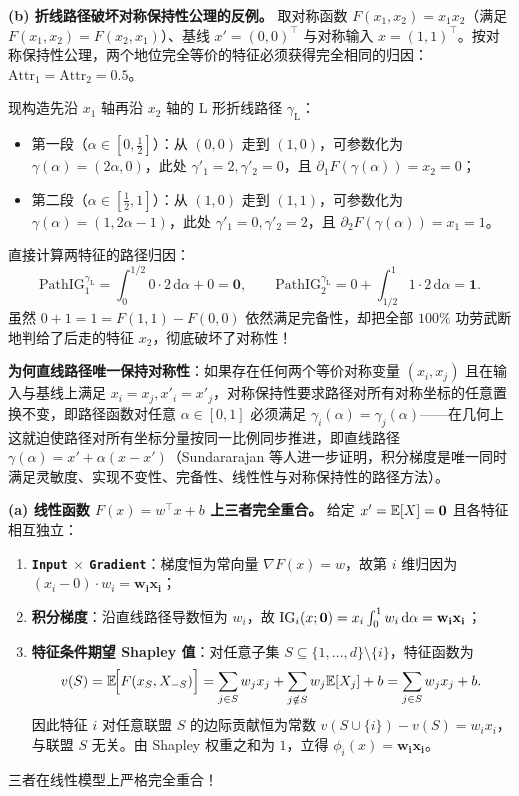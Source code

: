 \textbf{(b) 折线路径破坏对称保持性公理的反例。}
取对称函数 $F(x_1, x_2) = x_1 x_2$（满足 $F(x_1, x_2) = F(x_2, x_1)$）、基线 $x' = (0,0)^\top$ 与对称输入 $x = (1,1)^\top$。按对称保持性公理，两个地位完全等价的特征必须获得完全相同的归因：$\mathrm{Attr}_1 = \mathrm{Attr}_2 = 0.5$。

现构造先沿 $x_1$ 轴再沿 $x_2$ 轴的 L 形折线路径 $\gamma_{\text{L}}$：
\begin{itemize}
  \item 第一段（$\alpha \in [0, \frac{1}{2}]$）：从 $(0,0)$ 走到 $(1,0)$，可参数化为 $\gamma(\alpha) = (2\alpha, 0)$，此处 $\gamma'_1 = 2, \gamma'_2 = 0$，且 $\partial_1 F(\gamma(\alpha)) = x_2 = 0$；
  \item 第二段（$\alpha \in [\frac{1}{2}, 1]$）：从 $(1,0)$ 走到 $(1,1)$，可参数化为 $\gamma(\alpha) = (1, 2\alpha - 1)$，此处 $\gamma'_1 = 0, \gamma'_2 = 2$，且 $\partial_2 F(\gamma(\alpha)) = x_1 = 1$。
\end{itemize}
直接计算两特征的路径归因：
\[
  \mathrm{PathIG}_1^{\gamma_{\text{L}}} = \int_0^{1/2} 0 \cdot 2\,\mathrm{d}\alpha + 0 = \mathbf{0}, \qquad
  \mathrm{PathIG}_2^{\gamma_{\text{L}}} = 0 + \int_{1/2}^{1} 1 \cdot 2\,\mathrm{d}\alpha = \mathbf{1}.
\]
虽然 $0 + 1 = 1 = F(1,1) - F(0,0)$ 依然满足完备性，却把全部 $100\%$ 功劳武断地判给了后走的特征 $x_2$，彻底破坏了对称性！

\textbf{为何直线路径唯一保持对称性}：如果存在任何两个等价对称变量 $(x_i, x_j)$ 且在输入与基线上满足 $x_i = x_j, x'_i = x'_j$，对称保持性要求路径对所有对称坐标的任意置换不变，即路径函数对任意 $\alpha \in [0,1]$ 必须满足 $\gamma_i(\alpha) = \gamma_j(\alpha)$——在几何上这就迫使路径对所有坐标分量按同一比例同步推进，即直线路径 $\gamma(\alpha) = x' + \alpha(x - x')$（Sundararajan 等人进一步证明，积分梯度是唯一同时满足灵敏度、实现不变性、完备性、线性性与对称保持性的路径方法）。


\textbf{(a) 线性函数 $F(x) = w^\top x + b$ 上三者完全重合。}
给定 $x' = \mathbb{E}[X] = \mathbf{0}$ 且各特征相互独立：
\begin{enumerate}
  \item \textbf{\texttt{Input} $\times$ \texttt{Gradient}}：梯度恒为常向量 $\nabla F(x) = w$，故第 $i$ 维归因为 $(x_i - 0)\cdot w_i = \mathbf{w_i x_i}$；
  \item \textbf{积分梯度}：沿直线路径导数恒为 $w_i$，故 $\operatorname{IG}_i(x; \mathbf{0}) = x_i \int_0^1 w_i\,\mathrm{d}\alpha = \mathbf{w_i x_i}$；
  \item \textbf{特征条件期望 Shapley 值}：对任意子集 $S \subseteq \{1,\dots,d\} \setminus \{i\}$，特征函数为
  \[
    v(S) = \mathbb{E}\!\Big[F(x_S, X_{-S})\Big]
    = \sum_{j \in S} w_j x_j + \sum_{j \notin S} w_j \mathbb{E}[X_j] + b
    = \sum_{j \in S} w_j x_j + b.
  \]
  因此特征 $i$ 对任意联盟 $S$ 的边际贡献恒为常数 $v(S \cup \{i\}) - v(S) = w_i x_i$，与联盟 $S$ 无关。由 Shapley 权重之和为 $1$，立得 $\phi_i(x) = \mathbf{w_i x_i}$。
\end{enumerate}
三者在线性模型上严格完全重合！


